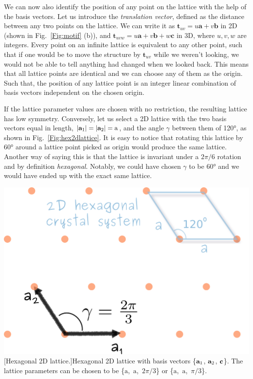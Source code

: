 We can now also identify the position of any point on the lattice with the help of the basis vectors. Let us introduce the \textit{translation vector}, defined as the distance between any two points on the lattice. We can write it as $\mathbf{t}_{uv}=u\mathbf{a}+v\mathbf{b}$ in 2D (shown in Fig.~\ref{Fig:motif} (b)), and $\mathbf{t}_{uvw}=u\mathbf{a}+v\mathbf{b}+w\mathbf{c}$ in 3D, where $u, v, w$ are integers. Every point on an infinite lattice is equivalent to any other point, such that if one would be to move the structure by $\mathbf{t}_{uv}$ while we weren't looking, we would not be able to tell anything had changed when we looked back. This means that all lattice points are identical and we can choose any of them as the origin. Such that, the position of any lattice point is an integer linear combination of basis vectors independent on the chosen origin.

\vspace{0.4cm}

\noindent \begin{minipage}{0.5\linewidth}
If the lattice parameter values are chosen with no restriction, the resulting lattice has low symmetry. Conversely, let us select a 2D lattice with the two basis vectors equal in length, $|\vb{a}_1|=|\vb{a}_2|=\mathrm{a}$\footnotemark, and the angle $\gamma$ between them of 120\si{\degree}, as shown in Fig.~\ref{Fig:hex2dlattice}. It is easy to notice that rotating this lattice by 60\si{\degree} around a lattice point picked as origin would produce the same lattice. Another way of saying this is that the lattice is invariant under a $2\pi/6$ rotation and by definition \textit{hexagonal}. Notably, we could have chosen $\gamma$ to be 60\si{\degree} and we would have ended up with the exact same lattice. 

\end{minipage}\hspace{0.5cm}
\begin{minipage}{0.5\linewidth}
 \centering
\includegraphics[width=1\linewidth]{Figures/hex2Dlattice.png}
\captionsetup{width=.8\linewidth}
[Hexagonal 2D lattice.]{Hexagonal 2D lattice with basis vectors \{$\vb{a}_1$, $\vb{a}_2$, $\vb{c}$\}. The lattice parameters can be chosen to be \{$\mathrm{a}$,~$\mathrm{a}$,~$2\pi/3$\} or  \{$\mathrm{a}$,~$\mathrm{a}$,~$\pi/3$\}. }
\label{Fig:hex2dlattice}
\end{minipage}
 
